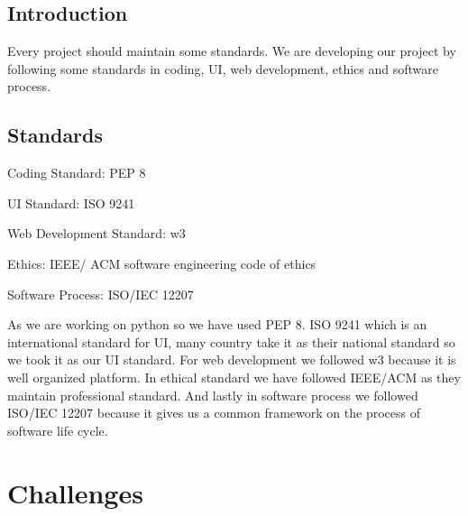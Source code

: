 \subsection{Introduction}
Every project should maintain some standards. We are developing our project by following some standards in coding, UI, web development, ethics and software process.
\subsection{Standards}
 
\begin{description}[font=$\bullet$~\normalfont\scshape\color{red!50!black}]

\item Coding Standard: PEP 8
\item UI Standard: ISO 9241
\item Web Development Standard: w3
\item Ethics: IEEE/ ACM software engineering code of ethics
\item Software Process: ISO/IEC 12207

\end{description}
 
As we are working on python so we have used PEP 8. ISO 9241 which is an international standard for UI, many country take it as their national standard so we took it as our UI standard. For web development we followed w3 because it is well organized platform. In ethical standard we have followed IEEE/ACM as they maintain professional standard. And lastly in software process we followed ISO/IEC 12207 because it gives us a common framework on the process of software life cycle.

\section{Challenges}

